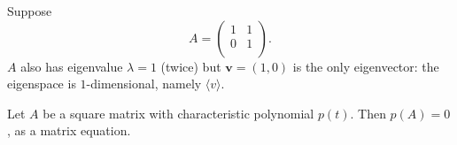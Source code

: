 \begin{example}
    Suppose 
    \[
        A =
        \begin{pmatrix}
            1 & 1 \\
            0 & 1 \\
        \end{pmatrix}
        .
    \]
    $A$ also has eigenvalue $\lambda = 1$ (twice) but $\bm{v} = (1, 0)$ is the only eigenvector: the eigenspace is $1$-dimensional, namely $\langle v \rangle$.
\end{example}

\begin{theorem}
    Let $A$ be a square matrix with characteristic polynomial $p(t)$. Then $p(A) = 0$, as a matrix equation.
\end{theorem}

